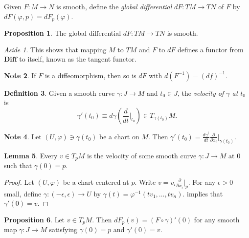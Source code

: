 \documentclass[10pt,letterpaper,cm]{nupset}
\theoremstyle{definition}
\newtheorem{definition}{Definition}[subsection]
\newtheorem{note}[definition]{Note}
\theoremstyle{theorem}
\newtheorem{lemma}[definition]{Lemma}
\newtheorem{prop}[definition]{Proposition}
\theoremstyle{remark}
\newtheorem*{aside}{Aside}
\newcommand{\1}{\mathbf{1}}
\newcommand{\0}{\vec 0}
\begin{document}
\medskip

Given $F: M \to N$ is smooth, define the \textit{global differential} $dF: TM \to TN$ of $F$ by $dF(\varphi, p) = dF_p(\varphi)$.


\begin{prop}
The global differential $dF: TM \to TN$ is smooth.
\end{prop}

\begin{aside}
This shows that mapping $M$ to $TM$ and $F$ to $dF$ defines a functor from $\mathbf{Diff}$ to itself, known as the tangent functor.
\end{aside}

\begin{note}
If $F$ is a diffeomorphism, then so is $dF$ with $d(F^{-1}) = \left(df\right)^{-1}$.
\end{note}

\bigskip

\begin{definition}
Given a smooth curve $\gamma : J \to M$ and $t_0 \in J$, the \textit{velocity of $\gamma$ at $t_0$} is  $$\gamma'(t_0) \equiv d\gamma \left(\frac{d}{dt}\bigr\rvert_{t_0} \right) \in T_{\gamma(t_0)}M.$$
\end{definition}

\begin{note}\label{rem}
Let $(U, \varphi) \ni \gamma(t_0)$ be a chart on $M$. Then $\gamma'(t_0) = \frac{d\gamma^i}{dt} \frac{\partial}{\partial{x_i}}\bigr\rvert_{\gamma(t_0)}$.
\end{note}

\begin{lemma}
Every $v \in T_pM$ is the velocity of some smooth curve $\gamma : J \to M$ at $0$ such that $\gamma(0)=p$.
\end{lemma}
\begin{proof}
Let $(U, \varphi)$ be a chart centered at $p$. Write $v = v_i \frac{\partial}{\partial{x_i}}\bigr\rvert_{p}$. For any $\epsilon >0$ small, define $\gamma: \left({-\epsilon} , \epsilon\right) \to U$ by $\gamma(t) = \varphi^{-1}(tv_1, \ldots, tv_n)$.  implies that $\gamma'(0) = v$.
\end{proof}

\begin{prop}
Let $v \in T_pM$. Then $dF_p(v) = (F \circ \gamma)'(0)$ for any smooth map $\gamma : J \to M$ satisfying $\gamma(0)=p$ and $\gamma'(0) =v$.
\end{prop}
\end{document}
